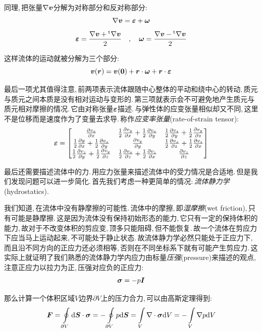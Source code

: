 同理,\,把张量$\nabla \boldsymbol{v}$分解为对称部分和反对称部分:
\[\nabla \boldsymbol{v}=\boldsymbol{\varepsilon}+\boldsymbol{\omega}\]
\[\boldsymbol{\varepsilon}=\frac{\nabla \boldsymbol{v}+\phantom{}^{\rm t}\nabla \boldsymbol{v}}{2}\quad,\quad \boldsymbol{\omega}=\frac{\nabla \boldsymbol{v}-\phantom{}^{\rm t}\nabla \boldsymbol{v}}{2}\]

这样流体的运动就被分解为三个部分:
\[\boldsymbol{v}(\boldsymbol{r})=\boldsymbol{v}(\boldsymbol{0})+\boldsymbol{r}\cdot \boldsymbol{\omega}+\boldsymbol{r}\cdot \boldsymbol{\varepsilon}\]

最后一项尤其值得注意,\,前两项表示流体跟随中心整体的平动和绕中心的转动,\,质元与质元之间本质是没有相对运动与变形的.\,第三项就表示会不可避免地产生质元与质元相对摩擦的情况.\,它由对称张量$\boldsymbol{\varepsilon}$描述.\,与弹性体的应变张量相似却又不同,\,这里不是位移而是速度作为了变量去求导.\,称作\emph{应变率张量}(rate-of-strain tensor):
\[\boldsymbol{\varepsilon}=\begin{bmatrix}\frac{\partial v_x}{\partial x}&\frac{1}{2}\frac{\partial v_y}{\partial x}+\frac{1}{2}\frac{\partial v_x}{\partial y}&\frac{1}{2}\frac{\partial v_z}{\partial y}+\frac{1}{2}\frac{\partial v_y}{\partial z}\\\frac{1}{2}\frac{\partial y}{\partial x}+\frac{1}{2}\frac{\partial v_x}{\partial y}&\frac{\partial v_y}{\partial y}&\frac{1}{2}\frac{\partial v_x}{\partial z}+\frac{1}{2}\frac{\partial v_z}{\partial x}\\\frac{1}{2}\frac{\partial v_z}{\partial y}+\frac{1}{2}\frac{\partial v_y}{\partial z}&\frac{1}{2}\frac{\partial v_x}{\partial z}+\frac{1}{2}\frac{\partial v_z}{\partial x}&\frac{\partial v_z}{\partial z}\end{bmatrix}\]

最后还需要描述流体中的力.\,用应力张量来描述流体中的受力情况是合适地.\,但是我们发现问题可以进一步简化.\,首先我们考虑一种更简单的情况:\,\emph{流体静力学}(hydrostatics).

我们知道,\,在流体中没有静摩擦的可能性.\,流体中的摩擦,\,即\emph{湿摩擦}(wet friction),\,只有可能是静摩擦.\,这是因为流体没有保持初始形态的能力,\,它只有一定的保持体积的能力,\,故对于不改变体积的剪应变,\,顶多只能阻碍,\,但不能恢复.\,故一个流体在剪应力下应当马上运动起来,\,不可能处于静止状态.\,故流体静力学必然只能处于正应力下,\,而且沿不同方向的正应力还必须相等,\,否则在不同坐标系下就有可能产生剪应力.\,这实际上就证明了我们熟悉的流体静力学内应力由标量\emph{压强}(pressure)来描述的观点,\,注意正应力以拉力为正,\,压强对应负的正应力:
\[\boldsymbol{\sigma}=-p\boldsymbol{I}\]

那么计算一个体积区域$V$边界$\partial V$上的压力合力,\,可以由高斯定理得到:
\[\boldsymbol{F}=\oint\limits_{\partial V}\textrm{d} \boldsymbol{S}\cdot \boldsymbol{\sigma}=-\oint\limits_{\partial V}p\textrm{d} \boldsymbol{S}=\int\limits_{V}\nabla\cdot\boldsymbol{\sigma}\textrm{d} V=-\int\limits_{V}\nabla p\textrm{d} V\]

